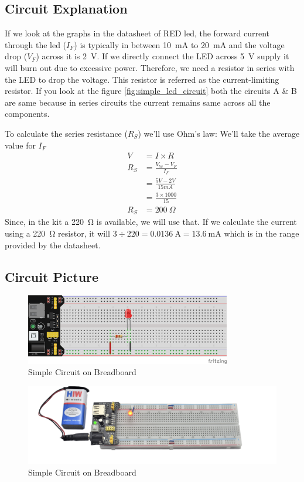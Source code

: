 \subsection{Circuit Explanation}
If we look at the graphs in the datasheet of RED led\cite{tlur640}, the forward current through the led ($I_F$) is typically 
in between \SI{10}{mA} to \SI{20}{mA} and the voltage drop ($V_F$) across it is \SI{2}{V}. If we directly connect the LED across 
\SI{5}{V} supply it will burn out due to excessive power. Therefore, we need a resistor in series with the LED to drop the voltage. 
This resistor is referred as the current-limiting resistor. If you look at the figure \ref{fig:simple_led_circuit} both the circuits 
A \& B are same because in series circuits the current remains same across all the components.

To calculate the series resistance ($R_S$) we'll use Ohm's law:
We'll take the average value for $I_F$
\begin{align*}
    V &= I \times R \\
    R_S &= \frac{V_{5v} - V_F}{I_F} \\
        &= \frac{5V - 2V}{15mA} \\
        &= \frac{3 \times 1000}{15} \\
    R_S &= \SI{200}{\Omega}
\end{align*}
Since, in the kit a \SI{220}{\ohm} is available, we will use that. If we calculate the current using a \SI{220}{\ohm} resistor, it will $3 \div 220 = \SI{0.0136}{\ampere} = \SI{13.6}{\mA}$ which is in the range provided by the datasheet.
\subsection{Circuit Picture}
\begin{figure}[htp]
    \centering
    \includegraphics[width=0.8\textwidth]{Pictures/lesson_circuits/LEDs/lesson_1.png}
    \caption{Simple Circuit on Breadboard}
    \label{fig:sc_bb}
\end{figure}
\begin{figure}[htp]
    \centering
    \includegraphics[width=\textwidth]{Pictures/lesson_circuits/LEDs/LC_1.png}
    \caption{Simple Circuit on Breadboard}
    \label{fig:sc_obb}
\end{figure}



